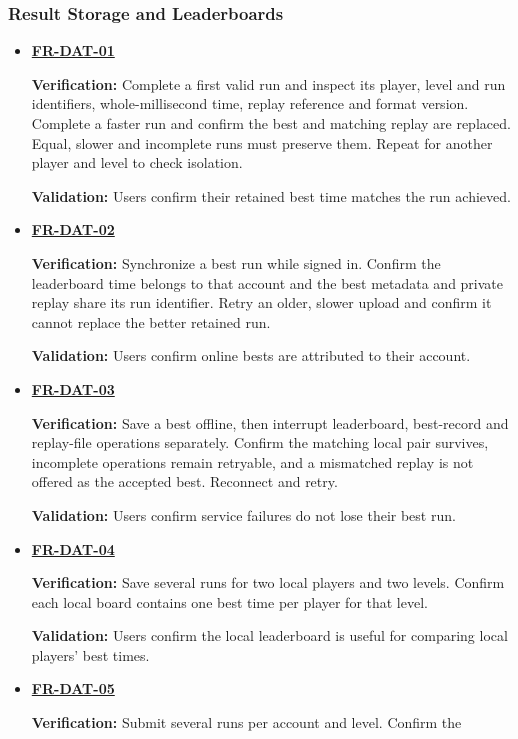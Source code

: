 \documentclass[12pt]{article}
\begin{document}
\subsubsection{Result Storage and Leaderboards}
\begin{itemize}
\item \hyperlink{req:FR-DAT-01}{\textbf{FR-DAT-01}}\par
 \textbf{Verification:} Complete a first valid run and inspect its player, level
 and run identifiers, whole-millisecond time, replay reference and format
 version. Complete a faster run and confirm the best and matching replay are
 replaced. Equal, slower and incomplete runs must preserve them. Repeat for
 another player and level to check isolation.\par
 \textbf{Validation:} Users confirm their retained best time matches the run achieved.
\item \hyperlink{req:FR-DAT-02}{\textbf{FR-DAT-02}}\par
 \textbf{Verification:} Synchronize a best run while signed in. Confirm the
 leaderboard time belongs to that account and the best metadata and private
 replay share its run identifier. Retry an older, slower upload and confirm
 it cannot replace the better retained run.\par
 \textbf{Validation:} Users confirm online bests are attributed to their account.
\item \hyperlink{req:FR-DAT-03}{\textbf{FR-DAT-03}}\par
 \textbf{Verification:} Save a best offline, then interrupt leaderboard,
 best-record and replay-file operations separately. Confirm the matching local
 pair survives, incomplete operations remain retryable, and a mismatched
 replay is not offered as the accepted best. Reconnect and retry.\par
 \textbf{Validation:} Users confirm service failures do not lose their best run.
\item \hyperlink{req:FR-DAT-04}{\textbf{FR-DAT-04}}\par
 \textbf{Verification:} Save several runs for two local players and two levels.
 Confirm each local board contains one best time per player for that level.\par
 \textbf{Validation:} Users confirm the local leaderboard is useful for
 comparing local players' best times.
\item \hyperlink{req:FR-DAT-05}{\textbf{FR-DAT-05}}\par
 \textbf{Verification:} Submit several runs per account and level. Confirm the

\end{itemize}
\end{document}
